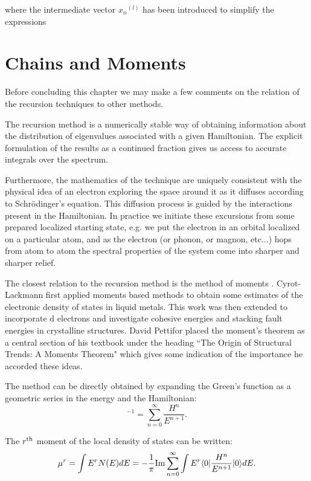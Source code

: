 where the intermediate vector $x_{n}{^(l)}$ has been introduced to simplify the expressions

\section{Chains and Moments}
Before concluding this chapter we may make a few 
comments on the relation of the recursion techniques 
to other methods.

The recursion method is a numerically stable way of obtaining information 
about the distribution of eigenvalues associated with a given Hamiltonian. 
The explicit formulation of the results as a continued fraction 
gives us access to accurate integrals over the spectrum. 

Furthermore, the mathematics of the technique are uniquely consistent
with the physical idea of an electron exploring
the space around it as it diffuses according to Schr\"odinger's
equation. This diffusion process is guided by the interactions present in the Hamiltonian.
In practice we initiate these excursions from some prepared localized starting state, e.g. 
we put the electron in an orbital localized on a particular atom,
and as the electron (or phonon, or magnon, etc...) hops from atom to atom
the spectral properties of the system come into sharper and sharper relief.

The closest relation to the recursion method is the method of moments
\cite{cyrotlackmann67, ducastelle70,ducastelle71}. Cyrot-Lackmann first applied
moments based methods to obtain some estimates of the electronic density of
states in liquid metals\cite{cyrotlackmann67}. This work was then extended
to incorporate d electrons and investigate cohesive energies and stacking
fault energies in crystalline structures. David Pettifor placed the moment's 
theorem as a central section of his textbook\cite{pettifor94} under the heading
``The Origin of Structural Trends: A Moments Theorem" which gives some indication
of the importance he accorded these ideas.

The method can be directly obtained by expanding the 
Green's function as a geometric series in the energy and the Hamiltonian:
%
\begin{equation}
[E-H]^{-1} = \sum_{n=0}^{\infty} \frac{H^{n}}{E^{n+1}}.
\end{equation}
%

The $r^{\rm th}$ moment of the local density of states can be written:
%
\begin{equation}
\mu^{r} = \int E^{r}N(E)dE = -\frac{1}{\pi}{\rm Im}\sum_{n=0}^{\infty}\int E^{r}\langle 0|\frac{H^{n}}{E^{n+1}}|0\rangle dE.
\end{equation}
%

